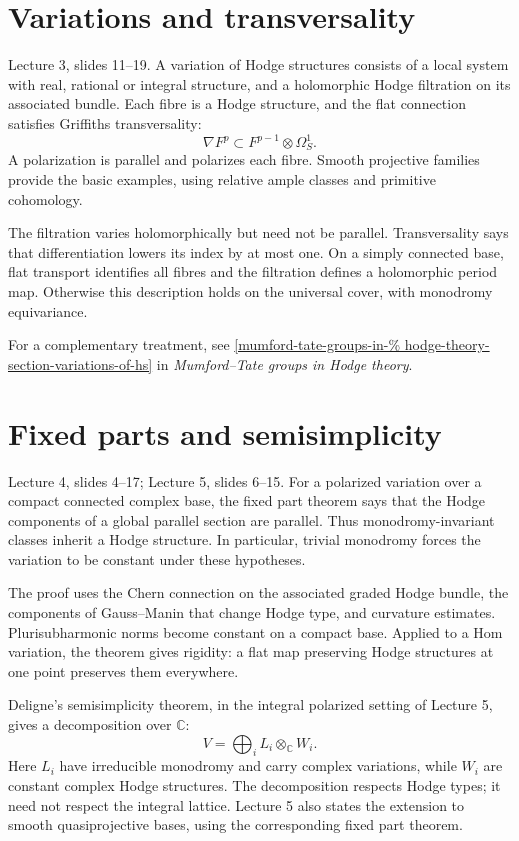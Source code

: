 \section{Variations and transversality}
\label{section-variations}

Lecture 3, slides 11--19.
A variation of Hodge structures consists
of a local system with real, rational or
integral structure, and a holomorphic
Hodge filtration on its associated bundle.
Each fibre is a Hodge structure, and the
flat connection satisfies Griffiths
transversality:
$$
\nabla F^p\subset F^{p-1}\otimes\Omega_S^1.
$$
A polarization is parallel and polarizes
each fibre. Smooth projective families
provide the basic examples, using relative
ample classes and primitive cohomology.

The filtration varies holomorphically but
need not be parallel. Transversality says
that differentiation lowers its index by
at most one. On a simply connected base,
flat transport identifies all fibres and
the filtration defines a holomorphic
period map. Otherwise this description
holds on the universal cover, with
monodromy equivariance.

For a complementary treatment, see
\ref{mumford-tate-groups-in-%
hodge-theory-section-variations-of-hs}
in {\it Mumford--Tate groups in Hodge
 theory}.

\section{Fixed parts and semisimplicity}
\label{section-fixed-part}

Lecture 4, slides 4--17;
Lecture 5, slides 6--15.
For a polarized variation over a compact
connected complex base, the fixed part
theorem says that the Hodge components of
a global parallel section are parallel.
Thus monodromy-invariant classes inherit
a Hodge structure. In particular, trivial
monodromy forces the variation to be
constant under these hypotheses.

The proof uses the Chern connection on
the associated graded Hodge bundle,
the components of Gauss--Manin that change
Hodge type, and curvature estimates.
Plurisubharmonic norms become constant on
a compact base. Applied to a Hom variation,
the theorem gives rigidity: a flat map
preserving Hodge structures at one point
preserves them everywhere.

Deligne's semisimplicity theorem, in the
integral polarized setting of Lecture 5,
gives a decomposition over $\mathbb C$:
$$
V=\bigoplus_i L_i\otimes_{\mathbb C}W_i.
$$
Here $L_i$ have irreducible monodromy and
carry complex variations, while $W_i$ are
constant complex Hodge structures.
The decomposition respects Hodge types;
it need not respect the integral lattice.
Lecture 5 also states the extension to
smooth quasiprojective bases, using the
corresponding fixed part theorem.

